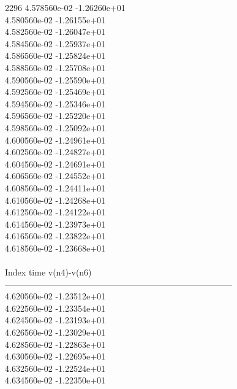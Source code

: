 2296	4.578560e-02	-1.26260e+01	\\ 	4.580560e-02	-1.26155e+01	\\ 	4.582560e-02	-1.26047e+01	\\ 	4.584560e-02	-1.25937e+01	\\ 	4.586560e-02	-1.25824e+01	\\ 	4.588560e-02	-1.25708e+01	\\ 	4.590560e-02	-1.25590e+01	\\ 	4.592560e-02	-1.25469e+01	\\ 	4.594560e-02	-1.25346e+01	\\ 	4.596560e-02	-1.25220e+01	\\ 	4.598560e-02	-1.25092e+01	\\ 	4.600560e-02	-1.24961e+01	\\ 	4.602560e-02	-1.24827e+01	\\ 	4.604560e-02	-1.24691e+01	\\ 	4.606560e-02	-1.24552e+01	\\ 	4.608560e-02	-1.24411e+01	\\ 	4.610560e-02	-1.24268e+01	\\ 	4.612560e-02	-1.24122e+01	\\ 	4.614560e-02	-1.23973e+01	\\ 	4.616560e-02	-1.23822e+01	\\ 	4.618560e-02	-1.23668e+01	\\ \hline
\\ \hline
Index   time            v(n4)-v(n6)     \\ \hline
--------------------------------------------------------------------------------\\ 	4.620560e-02	-1.23512e+01	\\ 	4.622560e-02	-1.23354e+01	\\ 	4.624560e-02	-1.23193e+01	\\ 	4.626560e-02	-1.23029e+01	\\ 	4.628560e-02	-1.22863e+01	\\ 	4.630560e-02	-1.22695e+01	\\ 	4.632560e-02	-1.22524e+01	\\ 	4.634560e-02	-1.22350e+01	\\ \hline

